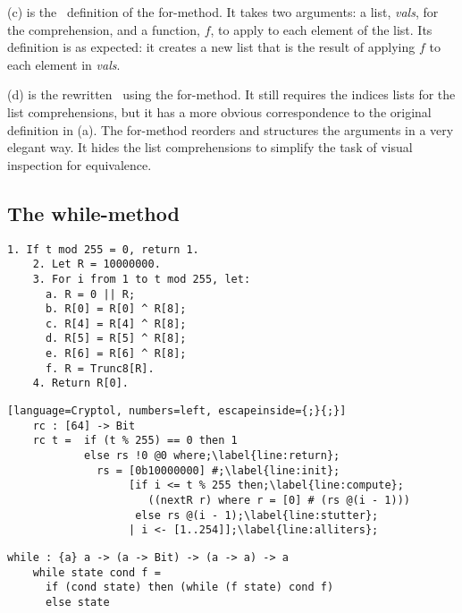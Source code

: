 (c) is the \cryptol\ definition of the for-method.
It takes two arguments: a list, \emph{vals}, for the comprehension, and a function, $f$, to apply to each element of the list.
Its definition is as expected: it creates a new list that is the result of applying $f$ to each element in \emph{vals}.

(d) is the rewritten \cryptol\ using the for-method.
It still requires the indices lists for the list comprehensions, but it has a more obvious correspondence to the original definition in (a).
The for-method reorders and structures the arguments in a very elegant way.
It hides the list comprehensions to simplify the task of visual inspection for equivalence.

\subsection{The while-method}

\newsavebox{\fipsRc}
\begin{lrbox}{\fipsRc}
  \begin{lstlisting}[basewidth = {.5em},basicstyle={\small}]
    1. If t mod 255 = 0, return 1.
    2. Let R = 10000000.
    3. For i from 1 to t mod 255, let:
      a. R = 0 || R;
      b. R[0] = R[0] ^ R[8];
      c. R[4] = R[4] ^ R[8];
      d. R[5] = R[5] ^ R[8];
      e. R[6] = R[6] ^ R[8];
      f. R = Trunc8[R].
    4. Return R[0].
  \end{lstlisting}
\end{lrbox}

\newsavebox{\RcCry}
\begin{lrbox}{\RcCry}
  \begin{lstlisting}[language=Cryptol, numbers=left, escapeinside={;}{;}]
    rc : [64] -> Bit
    rc t =  if (t % 255) == 0 then 1
            else rs !0 @0 where;\label{line:return};
              rs = [0b10000000] #;\label{line:init};
                   [if i <= t % 255 then;\label{line:compute};
                      ((nextR r) where r = [0] # (rs @(i - 1)))
                    else rs @(i - 1);\label{line:stutter};
                   | i <- [1..254]];\label{line:alliters};
  \end{lstlisting}
\end{lrbox}

\newsavebox{\whilemethod}
\begin{lrbox}{\whilemethod}
  \begin{lstlisting}[language=Cryptol]
    while : {a} a -> (a -> Bit) -> (a -> a) -> a
    while state cond f = 
      if (cond state) then (while (f state) cond f)	
      else state
  \end{lstlisting}
\end{lrbox}

